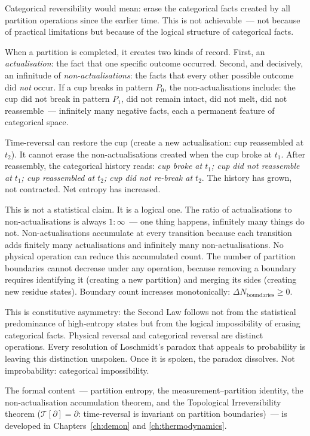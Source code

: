 Categorical reversibility would mean: erase the categorical facts created by all
partition operations since the earlier time. This is not achievable~--- not because
of practical limitations but because of the logical structure of categorical facts.

When a partition is completed, it creates two kinds of record. First, an
\emph{actualisation}: the fact that one specific outcome occurred.
Second, and decisively, an infinitude of \emph{non-actualisations}: the facts that
every other possible outcome did \emph{not} occur. If a cup breaks in pattern $P_0$,
the non-actualisations include: the cup did not break in pattern $P_1$, did not remain
intact, did not melt, did not reassemble~--- infinitely many negative facts, each
a permanent feature of categorical space.

Time-reversal can restore the cup (create a new actualisation: cup reassembled at $t_2$).
It cannot erase the non-actualisations created when the cup broke at $t_1$.
After reassembly, the categorical history reads: \emph{cup broke at $t_1$; cup did not
reassemble at $t_1$; cup reassembled at $t_2$; cup did not re-break at $t_2$}.
The history has grown, not contracted. Net entropy has increased.

This is not a statistical claim. It is a logical one. The ratio of actualisations to
non-actualisations is always $1 : \infty$~--- one thing happens, infinitely many things
do not. Non-actualisations accumulate at every transition because each transition adds
finitely many actualisations and infinitely many non-actualisations. No physical
operation can reduce this accumulated count. The number of partition boundaries cannot
decrease under any operation, because removing a boundary requires identifying it
(creating a new partition) and merging its sides (creating new residue states).
Boundary count increases monotonically: $\Delta N_{\text{boundaries}} \geq 0$.

This is constitutive asymmetry: the Second Law follows not from the statistical
predominance of high-entropy states but from the logical impossibility of
erasing categorical facts. Physical reversal and categorical reversal are distinct
operations. Every resolution of Loschmidt's paradox that appeals to probability
is leaving this distinction unspoken. Once it is spoken, the paradox dissolves.
Not improbability: categorical impossibility.

The formal content~--- partition entropy, the measurement--partition identity,
the non-actualisation accumulation theorem, and the Topological Irreversibility
theorem ($\mathcal{T}[\partial] = \partial$: time-reversal is invariant on partition
boundaries)~--- is developed in Chapters~\ref{ch:demon} and \ref{ch:thermodynamics}.


